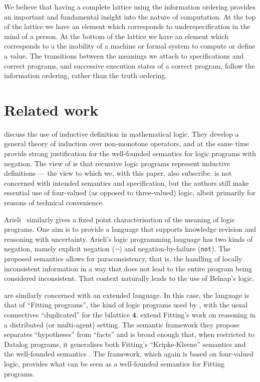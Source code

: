 \documentclass{tlp}
\newcommand{\Quad}{\ensuremath{\mathbf{4}}}
\begin{document}
We believe that having a complete lattice using the information
ordering provides an important and fundamental insight into the nature
of computation.  At the top of the lattice we have an element which
corresponds to underspecification in the mind of a person.  At the
bottom of the lattice we have an element which corresponds to a the
inability of a machine or formal system to compute or define a value.
The transitions between the meanings we attach to specifications and
correct programs, and successive execution states of a correct program,
follow the information ordering, rather than the truth ordering.

\section{Related work}
\label{sec-related}

 discuss
the use of inductive definition in mathematical logic.
They develop a general theory of induction over non-monotone
operators, and at the same time provide strong justification for
the well-founded semantics \cite{VanGelder91,Fitting:JLP93}
for logic programs with negation.
The view of  is that recursive logic
programs represent inductive definitions --- the view to which we,
with this paper, also subscribe.
 is not concerned with intended
semantics and specification, but the authors still make essential 
use of four-valued (as opposed to three-valued) logic, 
albeit primarily for reasons of technical convenience.

Arieli~\cite{Arieli:AMAI02} similarly gives a fixed point
characterisation of the meaning of logic programs.
One aim is to provide a language that supports knowledge revision
and reasoning with uncertainty.
Arieli's logic programming language has two kinds of negation,
namely explicit negation ($\neg$) and negation-by-failure
(\texttt{not}).
The proposed semantics allows for paraconsistency, that is, the
handling of locally inconsistent information in a way that does
not lead to the entire program being considered inconsistent.
That context naturally leads to the use of Belnap's logic.

 are similarly concerned with an extended language.
In this case, the language is that of ``Fitting programs'', the kind
of logic programs used by , with the usual
connectives ``duplicated'' for the bilattice $\Quad$.
 extend Fitting's work on reasoning in a
distributed (or multi-agent) setting.
The semantic framework they propose separates ``hypotheses'' from
``facts'' and is broad enough that, when restricted to Datalog
programs, it generalises both Fitting's ``Kripke-Kleene'' semantics
\cite{Fitting85} and the well-founded semantics \cite{VanGelder91}.
The framework, which again is based on four-valued logic, provides
what can be seen as a well-founded semantics for Fitting programs.
\end{document}
